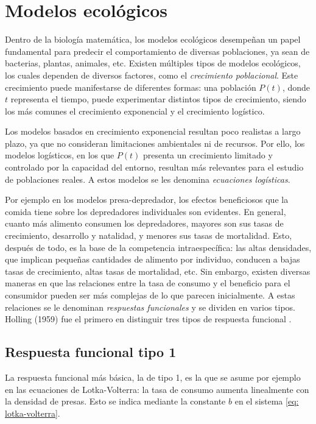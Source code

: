 \section{Modelos ecológicos}
 
Dentro de la biología matemática, los modelos ecológicos desempeñan un papel fundamental para predecir el comportamiento de diversas poblaciones, ya sean de bacterias, plantas, animales, etc. Existen múltiples tipos de modelos ecológicos, los cuales dependen de diversos factores, como el \textit{crecimiento poblacional}. Este crecimiento puede manifestarse de diferentes formas: una población $P(t)$, donde $t$ representa el tiempo, puede experimentar distintos tipos de crecimiento, siendo los más comunes el crecimiento exponencial y el crecimiento logístico.

\noindent Los modelos basados en crecimiento exponencial resultan poco realistas a largo plazo, ya que no consideran limitaciones ambientales ni de recursos. Por ello, los modelos logísticos, en los que $P(t)$ presenta un crecimiento limitado y controlado por la capacidad del entorno, resultan más relevantes para el estudio de poblaciones reales. A estos modelos se les denomina \textit{ecuaciones logísticas}. 

\noindent Por ejemplo en los modelos presa-depredador, los efectos beneficiosos que la comida tiene sobre los depredadores individuales son evidentes. En general, cuanto más alimento consumen los depredadores, mayores son sus tasas de crecimiento, desarrollo y natalidad, y menores sus tasas de mortalidad. Esto, después de todo, es la base de la competencia intraespecífica: las altas densidades, que implican pequeñas cantidades de alimento por individuo, conducen a bajas tasas de crecimiento, altas tasas de mortalidad, etc. Sin embargo, existen diversas maneras en que las relaciones entre la tasa de consumo y el beneficio para el consumidor pueden ser más complejas de lo que parecen inicialmente. A estas relaciones se le denominan \textit{respuestas funcionales} y se dividen en varios tipos. Holling (1959) fue el primero en distinguir tres tipos de respuesta funcional \cite[p. 79]{murray2002}.
\subsection{Respuesta funcional tipo 1}
La respuesta funcional más básica, la de tipo 1, es la que se asume por ejemplo en las ecuaciones de Lotka-Volterra: la tasa de consumo aumenta linealmente con la densidad de presas. Esto se indica mediante la constante $b$ en el sistema \ref{eq: lotka-volterra}.

